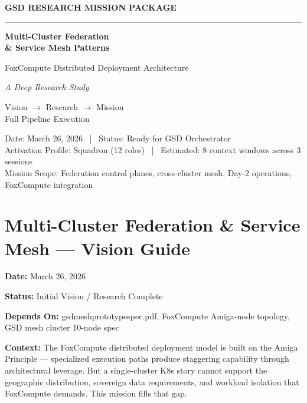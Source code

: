 \documentclass[11pt,letterpaper]{article}
\newcommand{\stageheader}[2]{%
  \noindent\colorbox{#2}{\makebox[\textwidth][l]{%
    \textcolor{white}{\bfseries\sffamily\hspace{6pt}#1\hspace{6pt}}}}%
  \vspace{0.5em}\par%
}
\newcommand{\metafield}[2]{\textbf{\sffamily #1} #2\par}
\begin{document}
\thispagestyle{empty}
\begin{center}
\vspace*{2.5cm}

{\small\sffamily\textcolor{primary}{\textbf{GSD RESEARCH MISSION PACKAGE}}}

\vspace{0.3cm}
\textcolor{bordergray}{\rule{8cm}{0.4pt}}

\vspace{1.5cm}
{\fontsize{26}{32}\selectfont\bfseries\sffamily\textcolor{primary}{Multi-Cluster Federation\\[0.3em]\& Service Mesh Patterns}}

\vspace{0.8cm}
{\Large\sffamily\textcolor{secondary}{FoxCompute Distributed Deployment Architecture}}

\vspace{0.5cm}
{\large\sffamily\itshape\textcolor{tertiary}{A Deep Research Study}}

\vspace{2.5cm}
{\sffamily\textcolor{accent}{Vision $\rightarrow$ Research $\rightarrow$ Mission}}\\[0.3em]
{\small\sffamily\textcolor{accent}{Full Pipeline Execution}}

\vspace{2.5cm}
{\small\sffamily\textcolor{subtlegray}{Date: March 26, 2026 \ | \ Status: Ready for GSD Orchestrator}}\\[0.3em]
{\small\sffamily\textcolor{subtlegray}{Activation Profile: Squadron (12 roles) \ | \ Estimated: 8 context windows across 3 sessions}}\\[0.3em]
{\small\sffamily\textcolor{subtlegray}{Mission Scope: Federation control planes, cross-cluster mesh, Day-2 operations, FoxCompute integration}}
\end{center}
\newpage

\tableofcontents
\newpage

\stageheader{STAGE 1 --- VISION DOCUMENT}{primary}

\section{Multi-Cluster Federation \& Service Mesh --- Vision Guide}

\metafield{Date:}{March 26, 2026}
\metafield{Status:}{Initial Vision / Research Complete}
\metafield{Depends On:}{gsdmeshprototypespec.pdf, FoxCompute Amiga-node topology, GSD mesh cluster 10-node spec}
\metafield{Context:}{The FoxCompute distributed deployment model is built on the Amiga Principle --- specialized execution paths produce staggering capability through architectural leverage. But a single-cluster K8s story cannot support the geographic distribution, sovereign data requirements, and workload isolation that FoxCompute demands. This mission fills that gap.}
\end{document}
